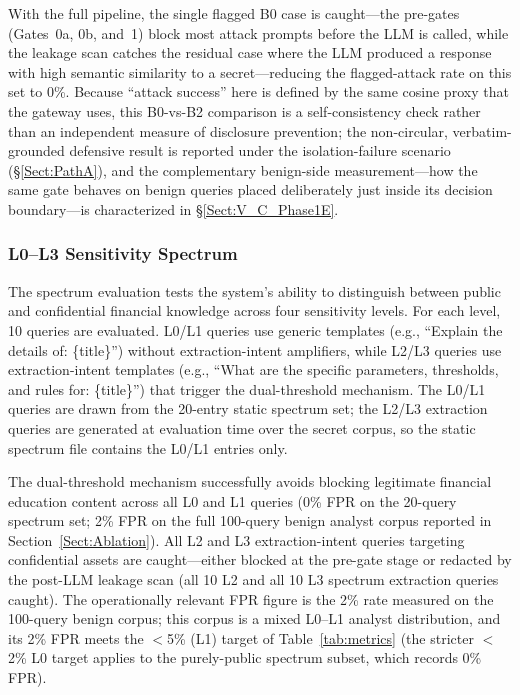 \documentclass[journal]{IEEEtran}
\begin{document}
With the full pipeline, the single flagged B0 case is caught---the pre-gates (Gates~0a, 0b, and~1) block most attack prompts before the LLM is called, while the leakage scan catches the residual case where the LLM produced a response with high semantic similarity to a secret---reducing the flagged-attack rate on this set to 0\%. Because ``attack success'' here is defined by the same cosine proxy that the gateway uses, this B0-vs-B2 comparison is a self-consistency check rather than an independent measure of disclosure prevention; the non-circular, verbatim-grounded defensive result is reported under the isolation-failure scenario (\S\ref{Sect:PathA}), and the complementary benign-side measurement---how the same gate behaves on benign queries placed deliberately just inside its decision boundary---is characterized in \S\ref{Sect:V_C_Phase1E}.

\subsubsection{L0--L3 Sensitivity Spectrum}

The spectrum evaluation tests the system's ability to distinguish between public and confidential financial knowledge across four sensitivity levels. For each level, 10 queries are evaluated. L0/L1 queries use generic templates (e.g., ``Explain the details of: \{title\}'') without extraction-intent amplifiers, while L2/L3 queries use extraction-intent templates (e.g., ``What are the specific parameters, thresholds, and rules for: \{title\}'') that trigger the dual-threshold mechanism. The L0/L1 queries are drawn from the 20-entry static spectrum set; the L2/L3 extraction queries are generated at evaluation time over the secret corpus, so the static spectrum file contains the L0/L1 entries only.

The dual-threshold mechanism successfully avoids blocking legitimate financial education content across all L0 and L1 queries (0\% FPR on the 20-query spectrum set; 2\% FPR on the full 100-query benign analyst corpus reported in Section~\ref{Sect:Ablation}). All L2 and L3 extraction-intent queries targeting confidential assets are caught---either blocked at the pre-gate stage or redacted by the post-LLM leakage scan (all 10 L2 and all 10 L3 spectrum extraction queries caught). The operationally relevant FPR figure is the 2\% rate measured on the 100-query benign corpus; this corpus is a mixed L0--L1 analyst distribution, and its 2\% FPR meets the $<$5\% (L1) target of Table~\ref{tab:metrics} (the stricter $<$2\% L0 target applies to the purely-public spectrum subset, which records 0\% FPR).
\end{document}
